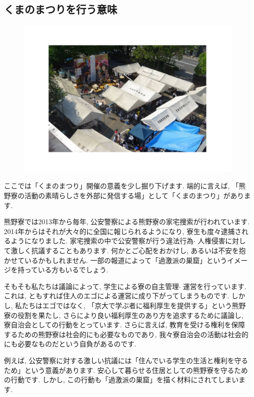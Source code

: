 \documentclass[10pt,b5jsbook,dvips,dvipdfmx,openany]{jsbook}
\theoremstyle{definition}
\begin{document}
		\subsection{くまのまつりを行う意味}
		
	\begin{figure}
		\includegraphics[scale=0.4]{kumano_fes.pdf}
			\label{fig:くまのまつり}
			\end{figure}
		ここでは「くまのまつり」開催の意義を少し掘り下げます. 端的に言えば, 「熊野寮の活動の素晴らしさを外部に発信する場」として「くまのまつり」があります. 

		熊野寮では2013年から毎年, 公安警察による熊野寮の家宅捜索が行われています. 2014年からはそれが大々的に全国に報じられるようになり, 寮生も度々逮捕されるようになりました. 家宅捜索の中で公安警察が行う違法行為$ \cdot $ 人権侵害に対して激しく抗議することもあります. 何かとご心配をおかけし, あるいは不安を抱かせているかもしれません. 一部の報道によって「過激派の巣窟」というイメージを持っている方もいるでしょう. 

		そもそも私たちは議論によって, 学生による寮の自主管理$ \cdot $ 運営を行っています. これは, ともすれば住人のエゴによる運営に成り下がってしまうものです. しかし, 私たちはエゴではなく, 「京大で学ぶ者に福利厚生を提供する」という熊野寮の役割を果たし, さらにより良い福利厚生のあり方を追求するために議論し, 寮自治会としての行動をとっています. さらに言えば, 教育を受ける権利を保障するための熊野寮は社会的にも必要なものであり, 我々寮自治会の活動は社会的にも必要なものだという自負があるのです. 
		
		例えば, 公安警察に対する激しい抗議には「住んでいる学生の生活と権利を守るため」という意義があります. 安心して暮らせる住居としての熊野寮を守るための行動です. しかし, この行動も「過激派の巣窟」を描く材料にされてしまいます. 
\end{document}
